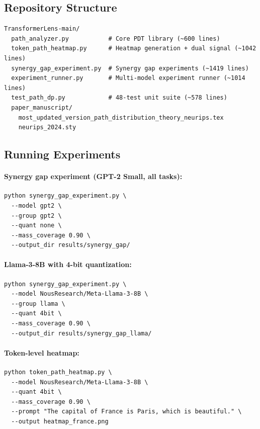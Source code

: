 \documentclass{article}
\begin{document}
\subsection{Repository Structure}

\begin{verbatim}
TransformerLens-main/
  path_analyzer.py           # Core PDT library (~600 lines)
  token_path_heatmap.py      # Heatmap generation + dual signal (~1042 lines)
  synergy_gap_experiment.py  # Synergy gap experiments (~1419 lines)
  experiment_runner.py       # Multi-model experiment runner (~1014 lines)
  test_path_dp.py            # 48-test unit suite (~578 lines)
  paper_manuscript/
    most_updated_version_path_distribution_theory_neurips.tex
    neurips_2024.sty
\end{verbatim}

\subsection{Running Experiments}

\paragraph{Synergy gap experiment (GPT-2 Small, all tasks):}
\begin{verbatim}
python synergy_gap_experiment.py \
  --model gpt2 \
  --group gpt2 \
  --quant none \
  --mass_coverage 0.90 \
  --output_dir results/synergy_gap/
\end{verbatim}

\paragraph{Llama-3-8B with 4-bit quantization:}
\begin{verbatim}
python synergy_gap_experiment.py \
  --model NousResearch/Meta-Llama-3-8B \
  --group llama \
  --quant 4bit \
  --mass_coverage 0.90 \
  --output_dir results/synergy_gap_llama/
\end{verbatim}

\paragraph{Token-level heatmap:}
\begin{verbatim}
python token_path_heatmap.py \
  --model NousResearch/Meta-Llama-3-8B \
  --quant 4bit \
  --mass_coverage 0.90 \
  --prompt "The capital of France is Paris, which is beautiful." \
  --output heatmap_france.png
\end{verbatim}
\end{document}
